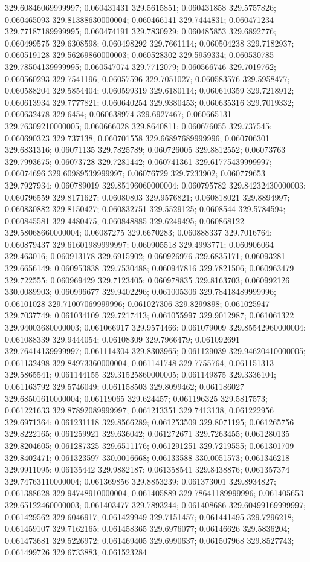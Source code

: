 329.60846069999997; 0.060431431 329.5615851; 0.060431858 329.5757826; 0.060465093 329.81388630000004; 0.060466141 329.7444831; 0.060471234 329.77187189999995; 0.060474191 329.7830929; 0.060485853 329.6892776; 0.060499575 329.6308598; 0.060498292 329.7661114; 0.060504238 329.7182937; 0.060519128 329.56269860000003; 0.060528302 329.5959334; 0.060530785 329.78504139999995; 0.060547074 329.7712079; 0.060566746 329.7019762; 0.060560293 329.7541196; 0.06057596 329.7051027; 0.060583576 329.5958477; 0.060588204 329.5854404; 0.060599319 329.6180114; 0.060610359 329.7218912; 0.060613934 329.7777821; 0.060640254 329.9380453; 0.060635316 329.7019332; 0.060632478 329.6454; 0.060638974 329.6927467; 0.060665131 329.76309210000005; 0.060666028 329.8640811; 0.060676055 329.737545; 0.060690323 329.737138; 0.060701558 329.66897689999996; 0.060706301 329.6831316; 0.06071135 329.7825789; 0.060726005 329.8812552; 0.06073763 329.7993675; 0.06073728 329.7281442; 0.060741361 329.61775439999997; 0.06074696 329.60989539999997; 0.06076729 329.7233902; 0.060779653 329.7927934; 0.060789019 329.85196060000004; 0.060795782 329.84232430000003; 0.060796559 329.8171627; 0.06080803 329.9576821; 0.060818021 329.8894997; 0.060830882 329.8150427; 0.060832751 329.5529125; 0.0608544 329.5784594; 0.060845581 329.4480475; 0.060848885 329.6249495; 0.060868122 329.58068660000004; 0.06087275 329.6670283; 0.060888337 329.7016764; 0.060879437 329.61601989999997; 0.060905518 329.4993771; 0.060906064 329.463016; 0.060913178 329.6915902; 0.060926976 329.6835171; 0.06093281 329.6656149; 0.060953838 329.7530488; 0.060947816 329.7821506; 0.060963479 329.722555; 0.060969429 329.7123405; 0.060978835 329.8163703; 0.060992126 330.0089903; 0.060996677 329.9402296; 0.061005306 329.78418489999996; 0.06101028 329.71007069999996; 0.061027306 329.8299898; 0.061025947 329.7037749; 0.061034109 329.7217413; 0.061055997 329.9012987; 0.061061322 329.94003680000003; 0.061066917 329.9574466; 0.061079009 329.85542960000004; 0.061088339 329.9444054; 0.06108309 329.7966479; 0.061092691 329.76414139999997; 0.061114304 329.8303965; 0.061129039 329.94620410000005; 0.061132498 329.84973360000004; 0.061141748 329.7755764; 0.061151313 329.5865541; 0.061144155 329.31525860000005; 0.061149875 329.3336104; 0.061163792 329.5746049; 0.061158503 329.8099462; 0.061186027 329.68501610000004; 0.06119065 329.624457; 0.061196325 329.5817573; 0.061221633 329.87892089999997; 0.061213351 329.7413138; 0.061222956 329.6971364; 0.061231118 329.8566289; 0.061253509 329.8071195; 0.061265756 329.8222165; 0.061259921 329.636042; 0.061272671 329.7263455; 0.061280135 329.8204605; 0.061287325 329.6511176; 0.061291251 329.7219555; 0.061301709 329.8402471; 0.061323597 330.0016668; 0.06133588 330.0051573; 0.061346218 329.9911095; 0.06135442 329.9882187; 0.061358541 329.8438876; 0.061357374 329.74763110000004; 0.061369856 329.8853239; 0.061373001 329.8934827; 0.061388628 329.94748910000004; 0.061405889 329.78641189999996; 0.061405653 329.65122460000003; 0.061403477 329.7893244; 0.061408686 329.60499169999997; 0.061429562 329.6046917; 0.061429949 329.7151457; 0.061441495 329.7296218; 0.061459107 329.7162165; 0.061458365 329.6976077; 0.06146626 329.5836204; 0.061473681 329.5226972; 0.061469405 329.6990637; 0.061507968 329.8527743; 0.061499726 329.6733883; 0.061523284 